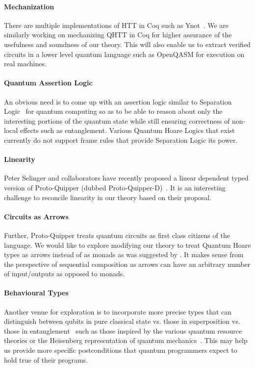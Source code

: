 \documentclass[acmsmall,nonacm,timestamp,review=false,anonymous=false]{acmart}
\begin{document}
\paragraph{Mechanization} There are multiple implementations of HTT in Coq such as Ynot~\cite{ynot2008}. We are similarly working on mechanizing QHTT in Coq for higher assurance of the usefulness and soundness of our theory. This will also enable us to extract verified circuits in a lower level quantum language such as OpenQASM for execution on real machines.

\paragraph{Quantum Assertion Logic} An obvious need is to come up with an assertion logic similar to Separation Logic~\cite{reynolds2002} for quantum computing so as to be able to reason about only the interesting portions of the quantum state while still ensuring correctness of non-local effects such as entanglement. Various Quantum Hoare Logics that exist~\cite{ying_floydhoare_2012} currently do not support frame rules that provide Separation Logic its power.

\paragraph{Linearity} Peter Selinger and collaborators have recently proposed a linear dependent typed version of Proto-Quipper (dubbed Proto-Quipper-D)~\cite{selinger2020,fu2020linear}. It is an interesting challenge to reconcile linearity in our theory based on their proposal.

\paragraph{Circuits as Arrows} Further, Proto-Quipper treats quantum circuits as first class citizens of the language. We would like to explore modifying our theory to treat Quantum Hoare types as arrows instead of as monads as was suggested by \citet{so-arrows}. It makes sense from the perspective of sequential composition as arrows can have an arbitrary number of input/outputs as opposed to monads.

\paragraph{Behavioural Types} Another venue for exploration is to incorporate more precise types that can distinguish between qubits in pure classical state vs. those in superposition vs. those in entanglement~\cite{JorrandPerdrix2009} such as those inspired by the various quantum resource theories or the Heisenberg representation of quantum mechanics~\cite{rand_type_2019,rssl20}. This may help us provide more specific postconditions that quantum programmers expect to hold true of their programs.
\end{document}
